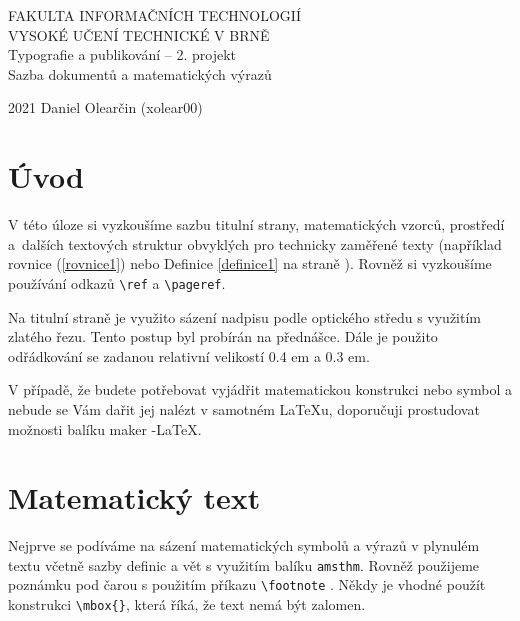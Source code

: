 \documentclass[a4paper, 11pt, twocolumn] {article}
\theoremstyle{definition}
\theoremstyle{plain}
\begin{document}
	\begin{titlepage}
		\begin{center}
			\huge{FAKULTA INFORMAČNÍCH TECHNOLOGIÍ\\
			VYSOKÉ UČENÍ TECHNICKÉ V BRNĚ}\\
			\LARGE{Typografie a publikování – 2. projekt\\
			Sazba dokumentů a matematických výrazů}\\
		\end{center}
		\Large{2021 \hfill Daniel Olearčin (xolear00)}
	\end{titlepage}
\setcounter{page}{1}

\section*{Úvod}
V této úloze si vyzkoušíme sazbu titulní strany, matematických vzorců, prostředí a~dalších textových struktur obvyklých pro technicky zaměřené texty (například rovnice (\ref{rovnice1}) nebo Definice \ref{definice1} na straně \pageref{definice1}). Rovněž si vyzkoušíme používání odkazů \verb|\ref| a \verb|\pageref|.

Na titulní straně je využito sázení nadpisu podle optického středu s využitím zlatého řezu. Tento postup byl
probírán na přednášce. Dále je použito odřádkování se
zadanou relativní velikostí 0.4 em a 0.3 em.

V případě, že budete potřebovat vyjádřit matematickou
konstrukci nebo symbol a nebude se Vám dařit jej nalézt
v samotném \LaTeX u, doporučuji prostudovat možnosti balíku maker \AmS-\LaTeX .

\section{Matematický text}
Nejprve se podíváme na sázení matematických symbolů
a výrazů v plynulém textu včetně sazby definic a vět s využitím balíku \texttt{amsthm}. Rovněž použijeme poznámku pod
čarou s použitím příkazu \verb|\footnote| . Někdy je vhodné
použít konstrukci \verb|\mbox{}|, která říká, že text nemá být
zalomen.\\
\end{document}
